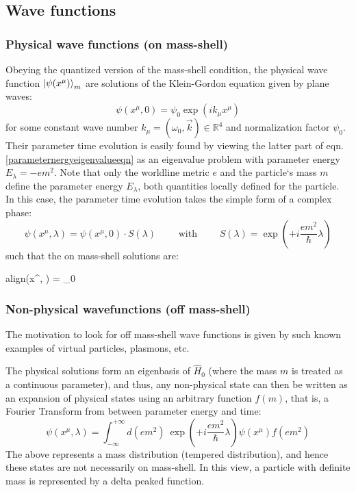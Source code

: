 \documentclass[a4paper,10pt]{article}
\numberwithin{equation}{section}
\newcommand{\boxedeq}[2]{\begin{empheq}[box={\fboxsep=6pt\fbox}]{align}\label{#1}#2\end{empheq}}
\begin{document}
\subsection{Wave functions}

\subsubsection{Physical wave functions (on mass-shell)}
Obeying the quantized version of the mass-shell condition, the physical wave function $\ket{\psi(x^\mu)}_m $ are solutions of the Klein-Gordon equation given by plane waves:
\begin{equation}
    \psi(x^\mu, 0) = \psi_0 \exp{\left( i k_\mu x^\mu \right)} 
\end{equation}
for some constant wave number $k_\mu = (\omega_0, \vec{k}) \in \mathbb{R}^4$ and normalization factor $\psi_0$. Their parameter time evolution is easily found by viewing the latter part of eqn. \ref{parameternergyeigenvalueeqn} as an eigenvalue problem with parameter energy $E_\lambda = -e m^2$. Note that only the worldline metric $e$ and the particle`s mass $m$ define the parameter energy $E_\lambda$, both quantities locally defined for the particle. In this case, the parameter time evolution takes the simple form of a complex phase:
\begin{equation}
    \psi (x^\mu, \lambda) = \psi(x^\mu, 0) \cdot S(\lambda) \qquad \text{ with } \qquad  S(\lambda) = 
\end{equation}
such that the on mass-shell solutions are:
\boxedeq{eq:masshellsolutions}{\psi(x^\mu, \lambda) = \psi_0 \exp{\left( i k_\mu x^\mu \right) }\exp{\left( +i \frac{e m^2}{\hbar} \lambda\right)}}


\subsubsection{Non-physical wavefunctions (off mass-shell)}
The motivation to look for off mass-shell wave functions is given by such known examples of virtual particles, plasmons, etc.

The physical solutions form an eigenbasis of $\hat{H}_0$ (where the mass $m$ is treated as a continuous parameter), and thus, any non-physical state can then be written as an expansion of physical states using an arbitrary function $f(m)$, that is, a Fourier Transform from between parameter energy and time:
\begin{equation}
    \psi (x^\mu, \lambda) = \int_{-\infty}^{+\infty}  d(em^2) \   \exp{\left( +i \frac{e m^2}{\hbar} \lambda\right)} \psi(x^\mu) f(em^2)
    \label{eq:FTmasslambda}
\end{equation}
The above represents a mass distribution (tempered distribution), and hence these states are not necessarily on mass-shell. In this view, a particle with definite mass is represented by a delta peaked function.
\end{document}
